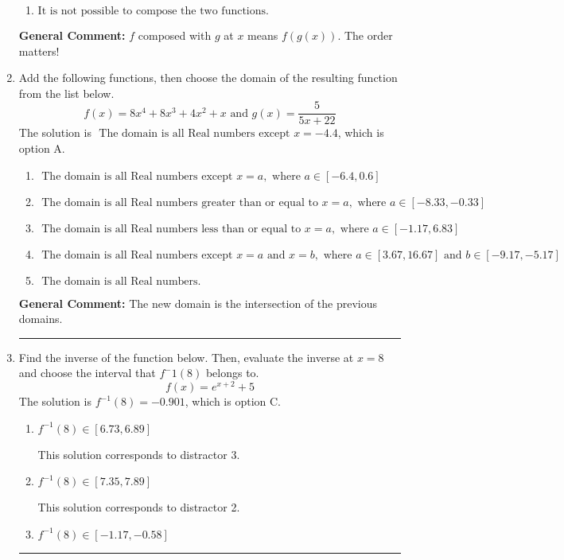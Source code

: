 \documentclass{extbook}[14pt]
\newcommand{\litem}[1]{\item #1

\rule{\textwidth}{0.4pt}}
\begin{document}
\begin{enumerate}
{\begin{enumerate}[label=\Alph*.]
 Distractor 2: Corresponds to being slightly off from the solution.
\item \( \text{It is not possible to compose the two functions.} \)


\end{enumerate}

\textbf{General Comment:} $f$ composed with $g$ at $x$ means $f(g(x))$. The order matters!
}
\litem{
Add the following functions, then choose the domain of the resulting function from the list below.
\[ f(x) = 8x^{4} +8 x^{3} +4 x^{2} +x \text{ and } g(x) = \frac{5}{5x+22} \]The solution is \( \text{ The domain is all Real numbers except } x = -4.4 \), which is option A.\begin{enumerate}[label=\Alph*.]
\item \( \text{ The domain is all Real numbers except } x = a, \text{ where } a \in [-6.4, 0.6] \)


\item \( \text{ The domain is all Real numbers greater than or equal to } x = a, \text{ where } a \in [-8.33, -0.33] \)


\item \( \text{ The domain is all Real numbers less than or equal to } x = a, \text{ where } a \in [-1.17, 6.83] \)


\item \( \text{ The domain is all Real numbers except } x = a \text{ and } x = b, \text{ where } a \in [3.67, 16.67] \text{ and } b \in [-9.17, -5.17] \)


\item \( \text{ The domain is all Real numbers. } \)


\end{enumerate}

\textbf{General Comment:} The new domain is the intersection of the previous domains.
}
\litem{
Find the inverse of the function below. Then, evaluate the inverse at $x = 8$ and choose the interval that $f^-1(8)$ belongs to.
\[ f(x) = e^{x+2}+5 \]The solution is \( f^{-1}(8) = -0.901 \), which is option C.\begin{enumerate}[label=\Alph*.]
\item \( f^{-1}(8) \in [6.73, 6.89] \)

 This solution corresponds to distractor 3.
\item \( f^{-1}(8) \in [7.35, 7.89] \)

 This solution corresponds to distractor 2.
\item \( f^{-1}(8) \in [-1.17, -0.58] \)


\end{enumerate}}
\end{enumerate}
\end{document}
